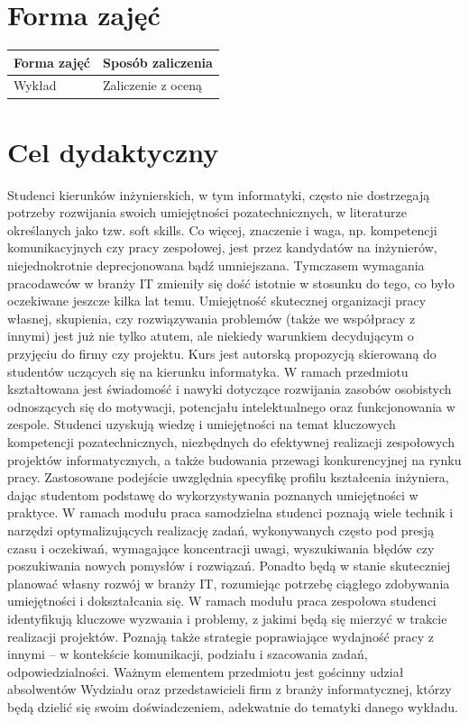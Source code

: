 \documentclass[12pt, a4paper]{article}
\begin{document}
\section{Forma zajęć}

\begin{tabular}{ll}
  \hline
  \textbf{Forma zajęć} & \textbf{Sposób zaliczenia} \\
  \hline
  Wykład & Zaliczenie z oceną \\
  \hline
\end{tabular}

\section{Cel dydaktyczny}

Studenci kierunków inżynierskich, w tym informatyki, często nie dostrzegają potrzeby rozwijania swoich umiejętności pozatechnicznych, w literaturze określanych jako tzw. soft skills. Co więcej, znaczenie i waga, np. kompetencji komunikacyjnych czy pracy zespołowej, jest przez kandydatów na inżynierów, niejednokrotnie deprecjonowana bądź umniejszana. Tymczasem wymagania pracodawców w branży IT zmieniły się dość istotnie w stosunku do tego, co było oczekiwane jeszcze kilka lat temu. Umiejętność skutecznej organizacji pracy własnej, skupienia, czy rozwiązywania problemów (także we współpracy z innymi) jest już nie tylko atutem, ale niekiedy warunkiem decydującym o przyjęciu do firmy czy projektu. Kurs jest autorską propozycją skierowaną do studentów uczących się na kierunku informatyka. W ramach przedmiotu kształtowana jest świadomość i nawyki dotyczące rozwijania zasobów osobistych odnoszących się do motywacji, potencjału intelektualnego oraz funkcjonowania w zespole. Studenci uzyskują wiedzę i umiejętności na temat kluczowych kompetencji pozatechnicznych, niezbędnych do efektywnej realizacji zespołowych projektów informatycznych, a także budowania przewagi konkurencyjnej na rynku pracy. Zastosowane podejście uwzględnia specyfikę profilu kształcenia inżyniera, dając studentom podstawę do wykorzystywania poznanych umiejętności w praktyce. W ramach modułu praca samodzielna studenci poznają wiele technik i narzędzi optymalizujących realizację zadań, wykonywanych często pod presją czasu i oczekiwań, wymagające koncentracji uwagi, wyszukiwania błędów czy poszukiwania nowych pomysłów i rozwiązań. Ponadto będą w stanie skuteczniej planować własny rozwój w branży IT, rozumiejąc potrzebę ciągłego zdobywania umiejętności i dokształcania się. W ramach modułu praca zespołowa studenci identyfikują kluczowe wyzwania i problemy, z jakimi będą się mierzyć w trakcie realizacji projektów. Poznają także strategie poprawiające wydajność pracy z innymi – w kontekście komunikacji, podziału i szacowania zadań, odpowiedzialności. Ważnym elementem przedmiotu jest gościnny udział absolwentów Wydziału oraz przedstawicieli firm z branży informatycznej, którzy będą dzielić się swoim doświadczeniem, adekwatnie do tematyki danego wykładu.
\end{document}
